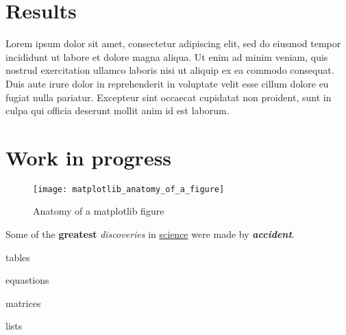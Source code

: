 \documentclass[12pt, letterpaper, twoside]{article}
\begin{document}
\section{Results}
\label{sec:results}
Lorem ipsum dolor sit amet, consectetur adipiscing elit, sed do eiusmod tempor incididunt ut labore et dolore magna aliqua. Ut enim ad minim veniam, quis nostrud exercitation ullamco laboris nisi ut aliquip ex ea commodo consequat. Duis aute irure dolor in reprehenderit in voluptate velit esse cillum dolore eu fugiat nulla pariatur. Excepteur sint occaecat cupidatat non proident, sunt in culpa qui officia deserunt mollit anim id est laborum.

\section{Work in progress}
\label{sec:results}

\begin{figure}[h]
\texttt{[image: matplotlib\_anatomy\_of\_a\_figure]}
\caption{Anatomy of a matplotlib figure}
\end{figure}

Some of the \textbf{greatest} \textit{discoveries} in \underline{science} were made by \textbf{\textit{accident}}.

tables

equastions

matrices

lists
\end{document}
